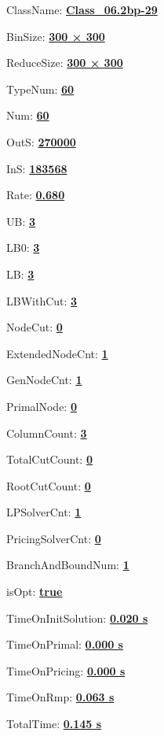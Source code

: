 \documentclass[11pt]{article}
\begin{document}
\pagestyle{empty}


ClassName: \underline{\textbf{Class_06.2bp-29}}
\par
BinSize: \underline{\textbf{300 × 300}}
\par
ReduceSize: \underline{\textbf{300 × 300}}
\par
TypeNum: \underline{\textbf{60}}
\par
Num: \underline{\textbf{60}}
\par
OutS: \underline{\textbf{270000}}
\par
InS: \underline{\textbf{183568}}
\par
Rate: \underline{\textbf{0.680}}
\par
UB: \underline{\textbf{3}}
\par
LB0: \underline{\textbf{3}}
\par
LB: \underline{\textbf{3}}
\par
LBWithCut: \underline{\textbf{3}}
\par
NodeCut: \underline{\textbf{0}}
\par
ExtendedNodeCnt: \underline{\textbf{1}}
\par
GenNodeCnt: \underline{\textbf{1}}
\par
PrimalNode: \underline{\textbf{0}}
\par
ColumnCount: \underline{\textbf{3}}
\par
TotalCutCount: \underline{\textbf{0}}
\par
RootCutCount: \underline{\textbf{0}}
\par
LPSolverCnt: \underline{\textbf{1}}
\par
PricingSolverCnt: \underline{\textbf{0}}
\par
BranchAndBoundNum: \underline{\textbf{1}}
\par
isOpt: \underline{\textbf{true}}
\par
TimeOnInitSolution: \underline{\textbf{0.020 s}}
\par
TimeOnPrimal: \underline{\textbf{0.000 s}}
\par
TimeOnPricing: \underline{\textbf{0.000 s}}
\par
TimeOnRmp: \underline{\textbf{0.063 s}}
\par
TotalTime: \underline{\textbf{0.145 s}}
\par
\newpage
\end{document}
